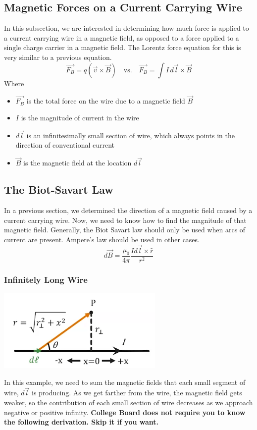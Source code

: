\documentclass[12pt, titlepage]{article}
\begin{document}
\subsection*{Magnetic Forces on a Current Carrying Wire}
In this subsection, we are interested in determining how much force is applied to a current carrying wire in a magnetic field, as opposed to a force applied to a single charge carrier in a magnetic field. The Lorentz force equation for this is very similar to a previous equation.
\begin{equation*}
    \vec{F_B} = q(\vec{v}\times\vec{B}) \quad \textrm{vs.} \quad \vec{F_B} = \int I \, d\vec{l} \times \vec{B}
\end{equation*}
Where
\begin{itemize}
    \item $\vec{F_B}$ is the total force on the wire due to a magnetic field $\vec{B}$
    \item $I$ is the magnitude of current in the wire
    \item $d\vec{l}$ is an infinitesimally small section of wire, which always points in the direction of conventional current
    \item $\vec{B}$ is the magnetic field at the location $d\vec{l}$
\end{itemize}

\subsection*{The Biot-Savart Law}

In a previous section, we determined the direction of a magnetic field caused by a current carrying wire. Now, we need to know how to find the magnitude of that magnetic field. Generally, the Biot Savart law should only be used when arcs of current are present. Ampere's law should be used in other cases.
\begin{equation*}
    d\vec{B} = \frac{\mu_0}{4\pi}\frac{Id\vec{l}\times\hat{r}}{r^2}
\end{equation*}
\subsubsection*{Infinitely Long Wire}
\begin{center}
    \includegraphics*[height=4cm]{media/longwire.png}
\end{center}
In this example, we need to sum the magnetic fields that each small segment of wire, $d\vec{l}$ is producing. As we get farther from the wire, the magnetic field gets weaker, so the contribution of each small section of wire decreases as we approach negative or positive infinity. \textbf{College Board does not require you to know the following derivation. Skip it if you want.}
\end{document}
